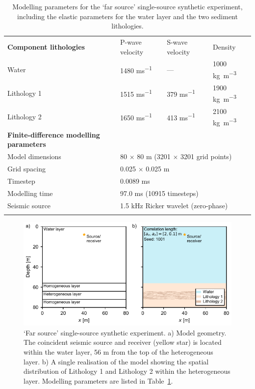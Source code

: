 \documentclass[se,manuscript]{copernicus}
\begin{document}
\begin{table}
    \caption{Modelling parameters for the `far source' single-source synthetic experiment, including the elastic parameters for the water layer and the two sediment lithologies.}
    \label{table:single-source-deep-parameters}
    \begin{tabular}{llll}
        \tophline
        \textbf{Component lithologies} & P-wave velocity & S-wave velocity & Density \\
        \middlehline
        Water & 1480 \unit{ms^{-1}} & --- & 1000 \unit{kg m^{-3}} \\
        Lithology 1 & 1515 \unit{ms^{-1}} & 379 \unit{ms^{-1}} & 1900 \unit{kg m^{-3}} \\
        Lithology 2 & 1650 \unit{ms^{-1}} & 413 \unit{ms^{-1}} & 2100 \unit{kg m^{-3}} \\
        \middlehline
        \textbf{Finite-difference modelling parameters} \\
        \middlehline
        Model dimensions & \multicolumn{3}{l}{80 $\times$ 80 \unit{m} (3201 $\times$ 3201 grid points)} \\
        Grid spacing & \multicolumn{3}{l}{0.025 $\times$ 0.025 \unit{m}} \\
        Timestep & \multicolumn{3}{l}{0.0089 \unit{ms}}\\
        Modelling time & \multicolumn{3}{l}{97.0 \unit{ms} (10915 timesteps)} \\
        Seismic source & \multicolumn{3}{l}{1.5 \unit{kHz} Ricker wavelet (zero-phase)} \\
        \bottomhline
    \end{tabular}
\end{table}

\begin{figure}
    \includegraphics{figures/si_fig11.pdf}
    \caption{`Far source' single-source synthetic experiment.
        a) Model geometry. The coincident seismic source and receiver (yellow star) is located within the water layer, 56 \unit{m} from the top of the heterogeneous layer.
        b) A single realisation of the model showing the spatial distribution of Lithology 1 and Lithology 2 within the heterogeneous layer. Modelling parameters are listed in Table~\ref{table:single-source-deep-parameters}.}
    \label{fig:single-source-deep-model} 
\end{figure}
\end{document}
